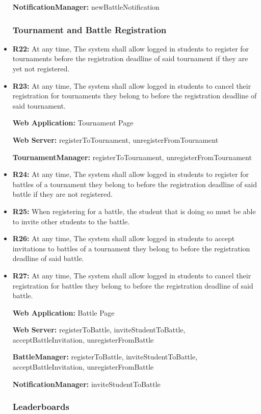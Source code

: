 \documentclass{article}
\begin{document}
\begin{itemize}
    \textbf{NotificationManager:} newBattleNotification

    \subsubsection*{Tournament and Battle Registration}

    \item \textbf{R22:} At any time, The system shall allow logged in students to register for tournaments before the registration deadline of said tournament if they are yet not registered.
    \item \textbf{R23:} At any time, The system shall allow logged in students to cancel their registration for tournaments they belong to before the registration deadline of said tournament.
    
    \textbf{Web Application:} Tournament Page

    \textbf{Web Server:} registerToTournament, unregisterFromTournament

    \textbf{TournamentManager:} registerToTournament, unregisterFromTournament

    \item \textbf{R24:} At any time, The system shall allow logged in students to register for battles of a tournament they belong to before the registration deadline of said battle if they are not registered.
    \item \textbf{R25:} When registering for a battle, the student that is doing so must be able to invite other students to the battle.
    \item \textbf{R26:} At any time, The system shall allow logged in students to accept invitations to battles of a tournament they belong to before the registration deadline of said battle.
    \item \textbf{R27:} At any time, The system shall allow logged in students to cancel their registration for battles they belong to before the registration deadline of said battle.
    
    \textbf{Web Application:} Battle Page

    \textbf{Web Server:} registerToBattle, inviteStudentToBattle, acceptBattleInvitation, unregisterFromBattle

    \textbf{BattleManager:} registerToBattle, inviteStudentToBattle, acceptBattleInvitation, unregisterFromBattle

    \textbf{NotificationManager:} inviteStudentToBattle

    \subsubsection*{Leaderboards}


\end{itemize}
\end{document}
